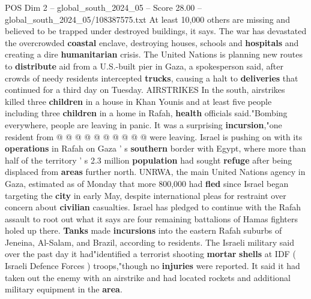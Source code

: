\begin{textsample}{POS Dim 2 – global\_south\_2024\_05 – Score 28.00 – global\_south\_2024\_05/108387575.txt}
At least 10,000 others are missing and believed to be trapped under destroyed buildings, it says.
The war has devastated the overcrowded \textbf{coastal} enclave, destroying houses, schools and \textbf{hospitals} and creating a dire \textbf{humanitarian} crisis.
The United Nations is planning new routes to \textbf{distribute} aid from a U.S.-built pier in Gaza, a spokesperson said, after crowds of needy residents intercepted \textbf{trucks}, causing a halt to \textbf{deliveries} that continued for a third day on Tuesday.
AIRSTRIKES In the south, airstrikes killed three \textbf{children} in a house in Khan Younis and at least five people including three \textbf{children} in a home in Rafah, \textbf{health} officials said."Bombing everywhere, people are leaving in panic.
It was a surprising \textbf{incursion},"one resident from @ @ @ @ @ @ @ @ @ @ were leaving.
Israel is pushing on with its \textbf{operations} in Rafah on Gaza ' s \textbf{southern} border with Egypt, where more than half of the territory ' s 2.3 million \textbf{population} had sought \textbf{refuge} after being displaced from \textbf{areas} further north.
UNRWA, the main United Nations agency in Gaza, estimated as of Monday that more 800,000 had \textbf{fled} since Israel began targeting the \textbf{city} in early May, despite international pleas for restraint over concern about \textbf{civilian} casualties.
Israel has pledged to continue with the Rafah assault to root out what it says are four remaining battalions of Hamas fighters holed up there. \textbf{Tanks} made \textbf{incursions} into the eastern Rafah suburbs of Jeneina, Al-Salam, and Brazil, according to residents.
The Israeli military said over the past day it had"identified a terrorist shooting \textbf{mortar} \textbf{shells} at IDF ( Israeli Defence Forces ) troops,"though no \textbf{injuries} were reported.
It said it had taken out the enemy with an airstrike and had located rockets and additional military equipment in the \textbf{area}.

\end{textsample}
